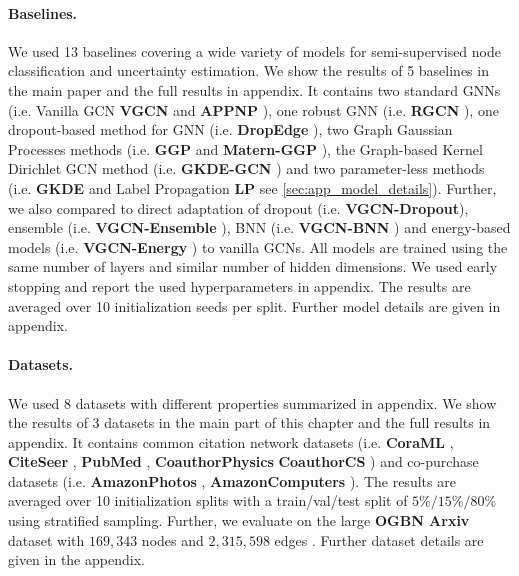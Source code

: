 \paragraph{Baselines.} We used 13 baselines covering a wide variety of models for semi-supervised node classification and uncertainty estimation. We show the results of 5 baselines in the main paper and the full results in appendix. It contains two standard GNNs (i.e. Vanilla GCN \textbf{VGCN} \citep{Kipf2016, Shchur2018} and \textbf{APPNP} \citep{Klicpera2018}), one robust GNN (i.e. \textbf{RGCN} \citep{Zhu2019}), one dropout-based method for GNN (i.e. \textbf{DropEdge} \citep{Rong2019}), two Graph Gaussian Processes methods (i.e. \textbf{GGP} \citep{Ng2018} and \textbf{Matern-GGP} \citep{Borovitskiy2020}), the Graph-based Kernel Dirichlet GCN method (i.e. \textbf{GKDE-GCN} \citep{Zhao2020}) and two parameter-less methods (i.e. \textbf{GKDE} \citep{Zhao2020} and Label Propagation \textbf{LP} see \cref{sec:app_model_details}). Further, we also compared to direct adaptation of dropout (i.e. \textbf{VGCN-Dropout}\citep{dropout}), ensemble (i.e. \textbf{VGCN-Ensemble} \citep{ensembles}), BNN (i.e. \textbf{VGCN-BNN} \citep{bayesian-networks}) and energy-based models (i.e. \textbf{VGCN-Energy} \citep{Liu2020a}) to vanilla GCNs. All models are trained using the same number of layers and similar number of hidden dimensions. We used early stopping and report the used hyperparameters in appendix. The results are averaged over 10 initialization seeds per split. Further model details are given in appendix.

\paragraph{Datasets.} We used 8 datasets with different properties summarized in appendix. We show the results of 3 datasets in the main part of this chapter and the full results in appendix. It contains common citation network datasets (i.e. \textbf{CoraML} \citep{Mccallum2000, Giles1998, Getoor2005, Sen2008a}, \textbf{CiteSeer} \citep{Giles1998, Getoor2005, Sen2008a}, \textbf{PubMed} \citep{Namata2012}, \textbf{CoauthorPhysics} \citep{Shchur2018} \textbf{CoauthorCS} \citep{Shchur2018})
 and co-purchase datasets (i.e. \textbf{AmazonPhotos} \citep{Mcauley2015, Shchur2018}, \textbf{AmazonComputers} \citep{Mcauley2015, Shchur2018}). The results are averaged over 10 initialization splits with a train/val/test split of $5\%/15\%/80\%$ using stratified sampling. Further, we evaluate on the large \textbf{OGBN Arxiv} dataset with $169,343$ nodes and $2,315,598$ edges \citep{ogb-dataset, microsoft-academic-graph}. Further dataset details are given in the appendix.
 
